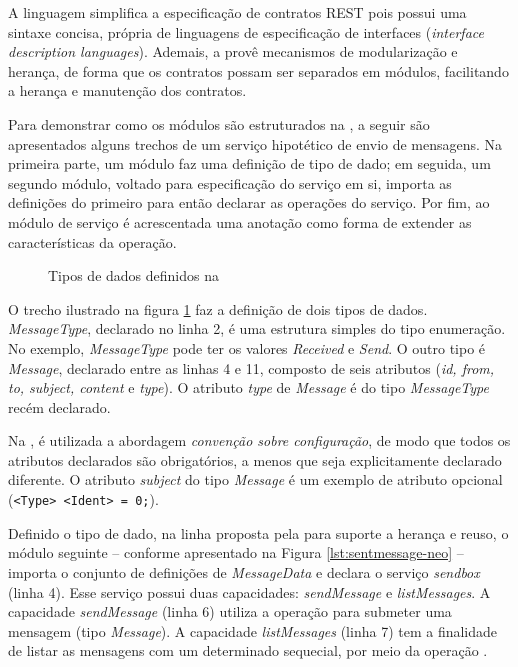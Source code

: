 A linguagem \neoidl{} simplifica a especificação de contratos REST pois possui
uma sintaxe concisa, própria de linguagens de especificação de interfaces
(\emph{interface description languages}). Ademais, a \neoidl{} provê mecanismos de
modularização e herança, de forma que os contratos possam ser separados em
módulos, facilitando a herança e manutenção dos
contratos. 

Para demonstrar como os módulos são estruturados na
\neoidl{}, a seguir são apresentados alguns trechos de um serviço hipotético
de envio de mensagens. Na primeira parte, um módulo faz uma definição de tipo
de dado; em seguida, um segundo módulo, voltado para especificação do serviço em
si, importa as definições do primeiro para então declarar as operações do
serviço. Por fim, ao módulo de serviço é acrescentada uma anotação como
forma de extender as características da operação.

\vspace{6mm}

\begin{figure}[h]
\begin{small}

\vspace{-.5cm}
\end{small} 
\caption{Tipos de dados definidos na \neoidl}
\label{lst:messagedata-neo}
\end{figure}

O trecho ilustrado na figura \ref{lst:messagedata-neo} faz a definição de dois
tipos de dados. \emph{MessageType}, declarado no linha 2, é uma estrutura
simples do tipo enumeração. No exemplo, \emph{MessageType} pode ter os valores
\emph{Received} e \emph{Send}.
O outro tipo é \emph{Message}, declarado entre as linhas 4 e 11,
composto de seis atributos (\emph{id, from, to, subject, content} e
\emph{type}).
O atributo \emph{type} de \emph{Message} é do tipo \emph{MessageType} recém declarado.

Na \neoidl{}, é utilizada a abordagem \emph{convenção sobre configuração}, de
modo que todos os atributos declarados são obrigatórios, a menos que
seja explicitamente declarado diferente. O atributo \emph{subject} do tipo
\emph{Message} é um exemplo de atributo opcional (\texttt{<Type> <Ident> = 0;}).

Definido o tipo de dado, na linha proposta pela \neoidl{} para
suporte a herança e reuso, o módulo seguinte -- conforme apresentado na Figura
\ref{lst:sentmessage-neo} -- importa o conjunto de definições de
\emph{MessageData} e declara o serviço \emph{sendbox} (linha 4). Esse serviço possui duas capacidades:
\emph{sendMessage} e \emph{listMessages}.
A capacidade \emph{sendMessage} (linha 6) utiliza a operação  para
submeter uma mensagem (tipo \emph{Message}). A capacidade \emph{listMessages}
(linha 7) tem a finalidade de listar as mensagens com um determinado sequecial,
por meio da operação .

